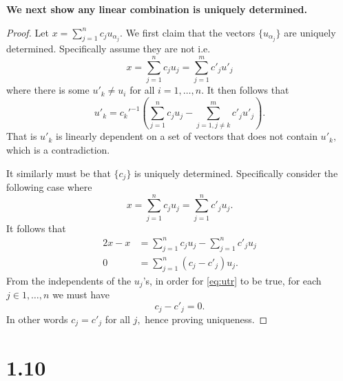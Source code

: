 \documentclass[10pt]{article}
\begin{document}
\noindent
\textbf{We next show any linear combination is uniquely determined.}

\begin{proof}
    Let $x = \sum_{j=1}^{n}c_ju_{\alpha_j}.$ We first claim that the vectors $\{u_{\alpha_j}\}$ are uniquely determined. Specifically assume they are not i.e.
    \begin{equation*}
        x = \sum_{j = 1}^{n}c_ju_j = \sum_{j=1}^{m}c'_ju'_j
    \end{equation*}
    where there is some $u'_k \neq u_i$ for all $i=1,\dots,n.$ It then follows that
    \begin{equation*}
        u'_k = c_k'^{-1}\left (\sum_{j = 1}^{n}c_ju_j - \sum_{j=1,j\neq k}^{m}c'_ju'_j\right ).
    \end{equation*}
    That is $u'_k$ is linearly dependent on a set of vectors that does not contain $u'_k,$ which is a contradiction.

   

    It similarly must be that $\{c_j\}$ is uniquely determined. Specifically consider the following case where
    \begin{equation*}
        x = \sum_{j=1}^{n}c_ju_j = \sum_{j=1}^{n}c'_ju_j.
    \end{equation*}
    It follows that
    \begin{alignat}{2}
        x - x &= \sum_{j=1}^{n}c_ju_j - \sum_{j=1}^{n}c'_ju_j\nonumber\\
        0 &= \sum_{j=1}^{n}(c_j - c'_j)u_j. \label{eq:utr}
    \end{alignat}
    From the independents of the $u_j$'s, in order for \eqref{eq:utr} to be true, for each $j\in1,\dots,n$ we must have
    \[c_j-c'_j = 0.\]
    In other words $c_j = c'_j$ for all $j,$ hence proving uniqueness.
\end{proof}

\section*{1.10}
\end{document}
